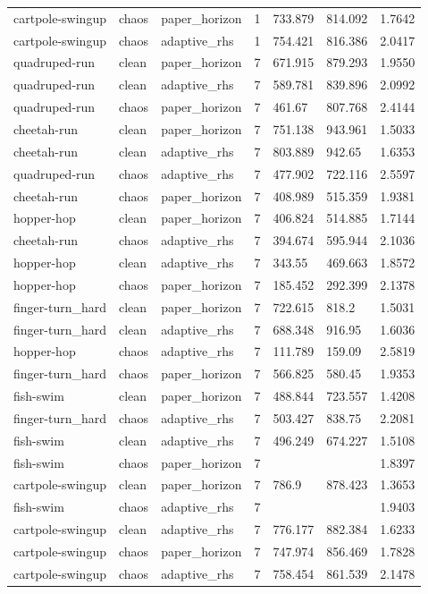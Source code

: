 \begin{tabular}{lllllll}
cartpole-swingup & chaos & paper\_horizon & 1 & 733.879 & 814.092 & 1.7642 \\
cartpole-swingup & chaos & adaptive\_rhs & 1 & 754.421 & 816.386 & 2.0417 \\
quadruped-run & clean & paper\_horizon & 7 & 671.915 & 879.293 & 1.9550 \\
quadruped-run & clean & adaptive\_rhs & 7 & 589.781 & 839.896 & 2.0992 \\
quadruped-run & chaos & paper\_horizon & 7 & 461.67 & 807.768 & 2.4144 \\
cheetah-run & clean & paper\_horizon & 7 & 751.138 & 943.961 & 1.5033 \\
cheetah-run & clean & adaptive\_rhs & 7 & 803.889 & 942.65 & 1.6353 \\
quadruped-run & chaos & adaptive\_rhs & 7 & 477.902 & 722.116 & 2.5597 \\
cheetah-run & chaos & paper\_horizon & 7 & 408.989 & 515.359 & 1.9381 \\
hopper-hop & clean & paper\_horizon & 7 & 406.824 & 514.885 & 1.7144 \\
cheetah-run & chaos & adaptive\_rhs & 7 & 394.674 & 595.944 & 2.1036 \\
hopper-hop & clean & adaptive\_rhs & 7 & 343.55 & 469.663 & 1.8572 \\
hopper-hop & chaos & paper\_horizon & 7 & 185.452 & 292.399 & 2.1378 \\
finger-turn\_hard & clean & paper\_horizon & 7 & 722.615 & 818.2 & 1.5031 \\
finger-turn\_hard & clean & adaptive\_rhs & 7 & 688.348 & 916.95 & 1.6036 \\
hopper-hop & chaos & adaptive\_rhs & 7 & 111.789 & 159.09 & 2.5819 \\
finger-turn\_hard & chaos & paper\_horizon & 7 & 566.825 & 580.45 & 1.9353 \\
fish-swim & clean & paper\_horizon & 7 & 488.844 & 723.557 & 1.4208 \\
finger-turn\_hard & chaos & adaptive\_rhs & 7 & 503.427 & 838.75 & 2.2081 \\
fish-swim & clean & adaptive\_rhs & 7 & 496.249 & 674.227 & 1.5108 \\
fish-swim & chaos & paper\_horizon & 7 &  &  & 1.8397 \\
cartpole-swingup & clean & paper\_horizon & 7 & 786.9 & 878.423 & 1.3653 \\
fish-swim & chaos & adaptive\_rhs & 7 &  &  & 1.9403 \\
cartpole-swingup & clean & adaptive\_rhs & 7 & 776.177 & 882.384 & 1.6233 \\
cartpole-swingup & chaos & paper\_horizon & 7 & 747.974 & 856.469 & 1.7828 \\
cartpole-swingup & chaos & adaptive\_rhs & 7 & 758.454 & 861.539 & 2.1478 \\
\bottomrule
\end{tabular}
